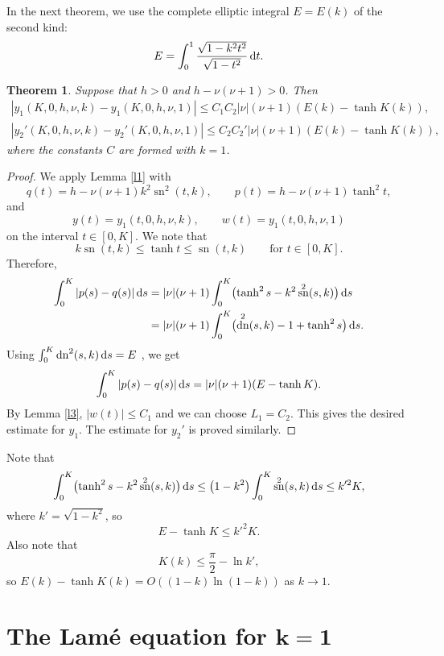 \documentclass[pdftex]{sigma}
\DeclareMathOperator{\sn}{sn}
\DeclareMathOperator{\dn}{dn}
\numberwithin{equation}{section}
\newtheorem{Theorem}{Theorem}[section]
\begin{document}
In the next theorem, we use the complete elliptic integral $E=E(k)$ of the second kind:
\[ E=\int_0^1 \frac{\sqrt{1-k^2t^2}}{\sqrt{1-t^2}}\,{\rm d}t .\]

\begin{Theorem}\label{t1}
Suppose that $h>0$ and $h-\nu(\nu+1)>0$. Then
\begin{gather*}
 |y_1(K,0,h,\nu,k)-y_1(K,0,h,\nu,1)|\le C_1C_2|\nu|(\nu+1)(E(k)-\tanh K(k)),\\
 |y_2'(K,0,h,\nu,k)-y_2'(K,0,h,\nu,1)|\le C_2C_2'|\nu|(\nu+1)(E(k)-\tanh K(k)),
\end{gather*}
where the constants $C$ are formed with $k=1$.
\end{Theorem}
\begin{proof}
We apply Lemma \ref{l1} with
\[ q(t)=h-\nu(\nu+1)k^2\sn^2(t,k),\qquad p(t)=h-\nu(\nu+1)\tanh^2 t,\]
and
\[ y(t)=y_1(t,0,h,\nu,k),\qquad w(t)=y_1(t,0,h,\nu,1) \]
on the interval $t\in[0,K]$. We note that \cite[formula~(4.4)]{V2004}
\[ k\sn(t,k)\le \tanh t\le \sn(t,k)\qquad \text{for $t\in[0,K]$} .\]
Therefore,
\begin{align*}
 \int_0^K|p(s)-q(s)|\,{\rm d}s&=|\nu|(\nu+1)\int_0^K \bigl(\tanh^2 s-k^2\sn^2(s,k)\bigr)\,{\rm d}s\\
 &= |\nu|(\nu+1)\int_0^K \bigl(\dn^2(s,k)-1+\tanh^2 s\bigr)\,{\rm d}s.
\end{align*}
Using $\int_0^K \dn^2(s,k)\,{\rm d}s= E$ \cite[p.~518]{WW}, we get
\[ \int_0^K|p(s)-q(s)|\,{\rm d}s=|\nu|(\nu+1)(E-\tanh K) .\]
By Lemma \ref{l3}, $|w(t)|\le C_1$ and we can choose $L_1=C_2$.
This gives the desired estimate for $y_1$. The estimate for $y_2'$ is proved similarly.
\end{proof}

Note that
\[ \int_0^K \bigl(\tanh^2s-k^2\sn^2(s,k)\bigr)\,{\rm d}s\le \bigl(1-k^2\bigr)\int_0^K \sn^2(s,k)\,{\rm d}s\le k'^2 K,\]
where $k'=\sqrt{1-k^2}$,
so
\[ E-\tanh K\le k'^2 K.\]
Also note that \cite[formula~(19.9.1)]{dlmf}
\[ K(k)\le \frac\pi2-\ln k' ,\]
so $E(k)-\tanh K(k)=O((1-k)\ln(1-k))$ as $k\to 1$.

\section[The Lam\'e equation for k=1]{The Lam\'e equation for $\boldsymbol{k=1}$}\label{Lame2}
\end{document}
